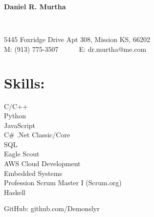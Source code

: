 \documentclass{res}
\begin{document}
\begin{resume}
\begin{changemargin}{-0.5in}{0in}
	\begin{center}
		\begin{Huge}
		\textbf{Daniel R. Murtha}
		\end{Huge}
	\\
		\begin{normalsize}
			5445 Foxridge Drive Apt 308, Mission KS, 66202\\
			M: (913) 775-3507~~~~~~E: dr.murtha@me.com
		\end{normalsize}
	\end{center}
\end{changemargin}\vspace{-10pt}
\section{Skills:}
{\setlength\multicolsep{0pt}
\begin{multicols}{3}
C/C++\\Python\\JavaScript\\C\# .Net Classic/Core\\
\columnbreak %
SQL\\Eagle Scout\\AWS Cloud Development\\Embedded Systems\\Profession Scrum Master I (Scrum.org)\\Haskell
\columnbreak
	\begin{flushright}
	GitHub: github.com/Demonslyr\\
	\end{flushright}
\end{multicols}}\vspace{-10pt}
 

\end{resume}
\end{document}
